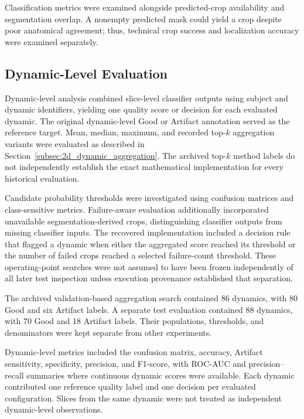 Classification metrics were examined alongside predicted-crop availability and segmentation overlap. A nonempty predicted mask could yield a crop despite poor anatomical agreement; thus, technical crop success and localization accuracy were examined separately.

\subsection{Dynamic-Level Evaluation}
\label{subsec:dynamic-evaluation}

Dynamic-level analysis combined slice-level classifier outputs using subject and dynamic identifiers, yielding one quality score or decision for each evaluated dynamic. The original dynamic-level Good or Artifact annotation served as the reference target. Mean, median, maximum, and recorded top-$k$ aggregation variants were evaluated as described in Section~\ref{subsec:2d_dynamic_aggregation}. The archived top-$k$ method labels do not independently establish the exact mathematical implementation for every historical evaluation.

Candidate probability thresholds were investigated using confusion matrices and class-sensitive metrics. Failure-aware evaluation additionally incorporated unavailable segmentation-derived crops, distinguishing classifier outputs from missing classifier inputs. The recovered implementation included a decision rule that flagged a dynamic when either the aggregated score reached its threshold or the number of failed crops reached a selected failure-count threshold. These operating-point searches were not assumed to have been frozen independently of all later test inspection unless execution provenance established that separation.

The archived validation-based aggregation search contained 86 dynamics, with 80 Good and six Artifact labels. A separate test evaluation contained 88 dynamics, with 70 Good and 18 Artifact labels. Their populations, thresholds, and denominators were kept separate from other experiments.

Dynamic-level metrics included the confusion matrix, accuracy, Artifact sensitivity, specificity, precision, and F1-score, with ROC-AUC and precision--recall summaries where continuous dynamic scores were available. Each dynamic contributed one reference quality label and one decision per evaluated configuration. Slices from the same dynamic were not treated as independent dynamic-level observations.

